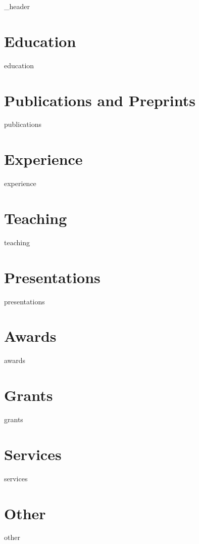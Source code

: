 \documentclass[letter,10pt]{article}
\author{Ian Zhang}
\begin{document}
{_header}
\vspace*{10pt}

\section{Education}
{education}
\vspace*{10pt}

\section{Publications and Preprints}
\vspace*{3pt}
{publications}
\vspace*{10pt}

\section{Experience}
{experience}
\vspace*{10pt}

\section{Teaching}
\vspace*{3pt}
{teaching}
\vspace*{10pt}

\section{Presentations}
\vspace*{3pt}
{presentations}
\vspace*{10pt}

\section{Awards}
\vspace*{3pt}
{awards}
\vspace*{10pt}

\section{Grants}
\vspace*{3pt}
{grants}
\vspace*{10pt}

\section{Services}
\vspace*{3pt}
{services}
\vspace*{10pt}

\section{Other}
\vspace*{3pt}
{other}
\vspace*{10pt}
\end{document}
